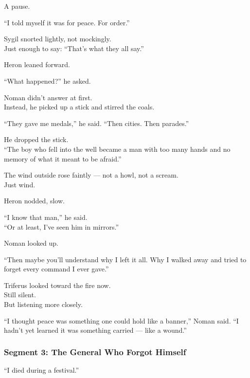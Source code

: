 \documentclass[9pt]{article}
\begin{document}
A pause.

“I told myself it was for peace. For order.”

Sygil snorted lightly, not mockingly.\\
Just enough to say: “That’s what they all say.”

\vspace{1em}

Heron leaned forward.

“What happened?” he asked.

Noman didn’t answer at first.\\
Instead, he picked up a stick and stirred the coals.

“They gave me medals,” he said. “Then cities. Then parades.”

He dropped the stick.\\
“The boy who fell into the well became a man with too many hands and no memory of what it meant to be afraid.”

The wind outside rose faintly — not a howl, not a scream.\\
Just wind.

\vspace{1em}

Heron nodded, slow.

“I know that man,” he said.\\
“Or at least, I’ve seen him in mirrors.”

\vspace{1em}

Noman looked up.

“Then maybe you’ll understand why I left it all. Why I walked away and tried to forget every command I ever gave.”

Triferus looked toward the fire now.\\
Still silent.\\
But listening more closely.

\vspace{1em}

“I thought peace was something one could hold like a banner,” Noman said. “I hadn’t yet learned it was something carried — like a wound.”

\newpage

\subsubsection*{Segment 3: The General Who Forgot Himself}

“I died during a festival.”
\end{document}
